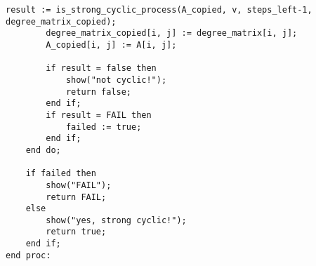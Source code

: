 \begin{lstlisting}[basicstyle=\scriptsize]
        result := is_strong_cyclic_process(A_copied, v, steps_left-1, degree_matrix_copied);
        degree_matrix_copied[i, j] := degree_matrix[i, j];
        A_copied[i, j] := A[i, j];
        
        if result = false then
            show("not cyclic!");
            return false;
        end if;
        if result = FAIL then
            failed := true;
        end if;
    end do;
    
    if failed then
        show("FAIL");
        return FAIL;
    else
        show("yes, strong cyclic!");
        return true;
    end if;
end proc:

\end{lstlisting}
